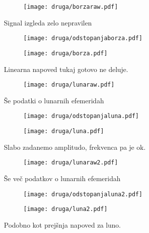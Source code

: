 \documentclass{article}
\begin{document}
\begin{figure}[H]
\centering
\begin{subfigure}{.75\textwidth}
\texttt{[image: druga/borzaraw.pdf]}
\end{subfigure}
\caption*{Signal izgleda zelo nepravilen}
\end{figure}


\begin{figure}[H]
\centering
\begin{subfigure}{.49\textwidth}
\texttt{[image: druga/odstopanjaborza.pdf]}
\end{subfigure}
\begin{subfigure}{.49\textwidth}
\texttt{[image: druga/borza.pdf]}
\end{subfigure}
\caption*{Linearna napoved tukaj gotovo ne deluje.}
\end{figure}

\begin{figure}[H]
\centering
\begin{subfigure}{.75\textwidth}
\texttt{[image: druga/lunaraw.pdf]}
\end{subfigure}
\caption*{Še podatki o lunarnih efemeridah}
\end{figure}

\begin{figure}[H]
\centering
\begin{subfigure}{.49\textwidth}
\texttt{[image: druga/odstopanjaluna.pdf]}
\end{subfigure}
\begin{subfigure}{.49\textwidth}
\texttt{[image: druga/luna.pdf]}
\end{subfigure}
\caption*{Slabo zadanemo amplitudo, frekvenca pa je ok.}
\end{figure}

\begin{figure}[H]
\centering
\begin{subfigure}{.75\textwidth}
\texttt{[image: druga/lunaraw2.pdf]}
\end{subfigure}
\caption*{Še več podatkov o lunarnih efemeridah}
\end{figure}

\begin{figure}[H]
\centering
\begin{subfigure}{.49\textwidth}
\texttt{[image: druga/odstopanjaluna2.pdf]}
\end{subfigure}
\begin{subfigure}{.49\textwidth}
\texttt{[image: druga/luna2.pdf]}
\end{subfigure}
\caption*{Podobno kot prejšnja napoved za luno.}
\end{figure}
\end{document}

